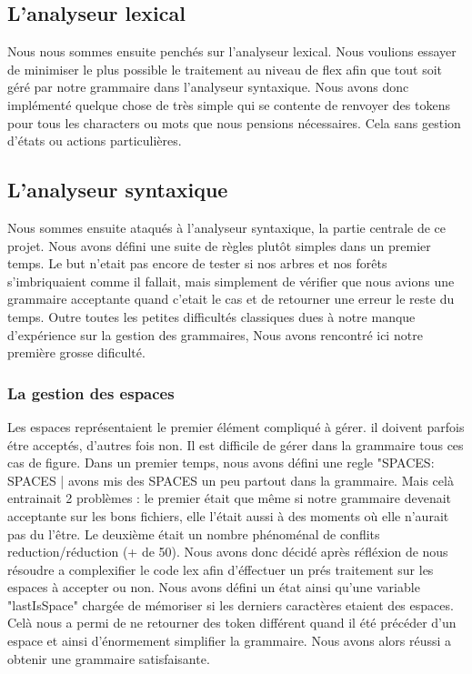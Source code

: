 \documentclass[12pt]{article}
\begin{document}
\subsection{L'analyseur lexical}

Nous nous sommes ensuite penchés sur l'analyseur lexical. Nous voulions essayer de
minimiser le plus possible le traitement au niveau de flex afin que tout soit géré
par notre grammaire dans l'analyseur syntaxique. Nous avons donc implémenté
quelque chose de très simple qui se contente de renvoyer des tokens pour tous les
characters ou mots que nous pensions nécessaires. Cela sans gestion d'états ou actions
particulières.

\subsection{L'analyseur syntaxique}

Nous sommes ensuite ataqués à l'analyseur syntaxique, la partie centrale de ce projet.
Nous avons défini une suite de règles plutôt simples dans un premier temps. Le but
n'etait pas encore de tester si nos arbres et nos forêts s'imbriquaient comme il fallait,
mais simplement de vérifier que nous avions une grammaire acceptante quand c'etait
le cas et de retourner une erreur le reste du temps.
\newline
Outre toutes les petites difficultés classiques dues à notre manque d'expérience
sur la gestion des grammaires, Nous avons rencontré ici notre première
grosse dificulté.

\subsubsection{La gestion des espaces}

Les espaces représentaient le premier élément compliqué à gérer. il doivent parfois étre acceptés,
d'autres fois non. Il est difficile de gérer dans la grammaire tous ces cas de figure.
Dans un premier temps, nous avons défini une regle "SPACES: SPACES | %
avons mis des SPACES un peu partout dans la grammaire. Mais celà entrainait 2 problèmes :
le premier était que même si notre grammaire devenait acceptante sur les bons fichiers,
elle l'était aussi à des moments où elle n'aurait pas du l'être. Le deuxième était un
nombre phénoménal de conflits reduction/réduction (+ de 50).
\newline
Nous avons donc décidé après réfléxion de nous résoudre a complexifier le code lex
afin d'éffectuer un prés traitement sur les espaces à accepter ou non.
Nous avons défini un état ainsi qu'une variable "lastIsSpace" chargée de mémoriser
si les derniers caractères etaient des espaces. Celà nous a permi de ne retourner des token
différent quand il été précéder d'un espace et ainsi d'énormement simplifier la grammaire.
Nous avons alors réussi a obtenir une grammaire satisfaisante.
\end{document}
